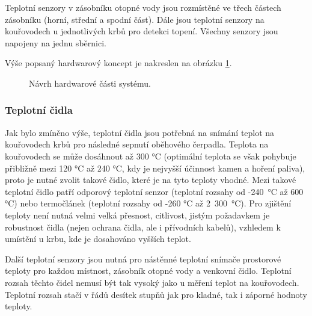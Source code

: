 Teplotní senzory v zásobníku otopné vody jsou rozmístěné ve třech částech zásobníku (horní, střední a spodní část). Dále jsou teplotní senzory na kouřovodech u jednotlivých krbů pro detekci topení. Všechny senzory jsou napojeny na jednu sběrnici.

Výše popsaný hardwarový koncept je nakreslen na obrázku \ref{fig:navrh-hardwarove-casti}.

\begin{figure}[H]
    \centering
    \def\svgwidth{\columnwidth}
    
    \caption{ Návrh hardwarové části systému.}
    \label{fig:navrh-hardwarove-casti}
\end{figure}

\subsubsection{Teplotní čidla}
Jak bylo zmíněno výše, teplotní čidla jsou potřebná na snímání teplot na kouřovodech krbů pro následné sepnutí oběhového čerpadla. Teplota na kouřovodech se může dosáhnout až 300 °C (optimální teplota se však pohybuje přibližně mezi 120 °C až 240 °C, kdy je nejvyšší účinnost kamen a hoření paliva), proto je nutné zvolit takové čidlo, které je na tyto teploty vhodné. Mezi takové teplotní čidlo patří odporový teplotní senzor (teplotní rozsahy od -240~°C až 600 °C) nebo termočlánek (teplotní rozsahy od -260 °C až 2~300~°C). Pro zjištění teploty není nutná velmi velká přesnost, citlivost, jistým požadavkem je robustnost čidla (nejen ochrana čidla, ale i přívodních kabelů), vzhledem k umístění u krbu, kde je dosahováno vyšších teplot.


Další teplotní senzory jsou nutná pro nástěnné teplotní snímače prostorové teploty pro každou místnost, zásobník otopné vody a venkovní čidlo. Teplotní rozsah těchto čidel nemusí být tak vysoký jako u měření teplot na kouřovodech. Teplotní rozsah stačí v řádů desítek stupňů jak pro kladné, tak i záporné hodnoty teploty. %

